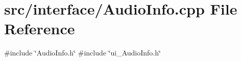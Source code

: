 \section{src/interface/\+Audio\+Info.cpp File Reference}
\label{_audio_info_8cpp}
{\ttfamily \#include \char`\"{}Audio\+Info.\+h\char`\"{}}\newline
{\ttfamily \#include \char`\"{}ui\+\_\+\+Audio\+Info.\+h\char`\"{}}\newline
